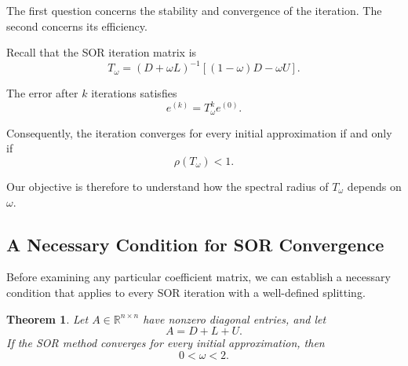 \documentclass[11pt,a4paper]{article}
\newtheorem{theorem}{Theorem}[section]
\theoremstyle{definition}
\theoremstyle{remark}
\begin{document}
The first question concerns the stability and convergence
of the iteration. The second concerns its efficiency.

Recall that the SOR iteration matrix is
\begin{equation}
    T_\omega
    =
    (D+\omega L)^{-1}
    \left[(1-\omega)D-\omega U\right].
    \label{eq:sor_matrix_convergence}
\end{equation}

The error after $k$ iterations satisfies
\[
    e^{(k)}=T_\omega^k e^{(0)}.
\]

Consequently, the iteration converges for every initial
approximation if and only if
\begin{equation}
    \boxed{\rho(T_\omega)<1.}
    \label{eq:sor_spectral_condition}
\end{equation}

Our objective is therefore to understand how the
spectral radius of $T_\omega$ depends on $\omega$.


\subsection{A Necessary Condition for SOR Convergence}

Before examining any particular coefficient matrix,
we can establish a necessary condition that applies
to every SOR iteration with a well-defined splitting.

\begin{theorem}
Let $A\in\mathbb{R}^{n\times n}$ have nonzero diagonal
entries, and let
\[
    A=D+L+U.
\]
If the SOR method converges for every initial
approximation, then
\[
    \boxed{0<\omega<2.}
\]
\end{theorem}
\end{document}
